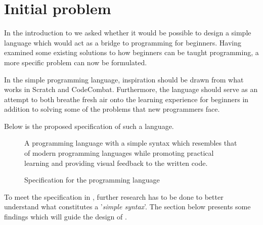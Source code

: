 \section{Initial problem}\label{sec:initial_problem}
In the introduction to  we asked whether it would be possible to design a simple language which would act as a bridge to programming for beginners.
Having examined some existing solutions to how beginners can be taught programming, a more specific problem can now be formulated.

In the simple programming language, inspiration should be drawn from what works in Scratch and CodeCombat. Furthermore, the language should serve as an attempt to both breathe fresh air onto the learning experience for beginners in addition to solving some of the problems that new programmers face.

Below is the proposed specification of such a language.

\begin{figure}[h]
    \vspace{0.5cm}
    \centering
    \begin{framed}
        A programming language with a simple syntax which resembles that of modern programming languages while promoting practical learning and providing visual feedback to the written code.
    \end{framed}
    \vspace{-0.5cm}
    \caption{Specification for the \dazel{} programming language}
    \label{fig:dazel_specification}
    \vspace{0.5cm}
\end{figure}

To meet the specification in , further research has to be done to better understand what constitutes a '\textit{simple syntax}'. The section below presents some findings which will guide the design of \dazel{}.